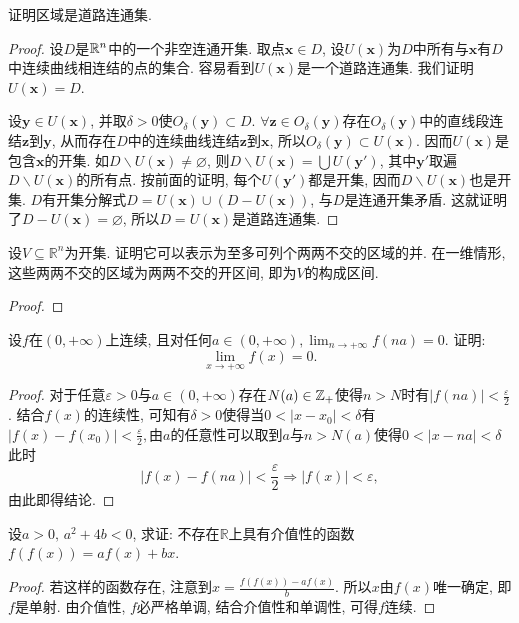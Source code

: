 \begin{quizb}
\woe 证明区域是道路连通集.
\begin{proof}
	设\(D\)是\(\mathbb{R}^n\)中的一个非空连通开集. 取点\(\boldsymbol{x}\in D\), 设\(U\left(\boldsymbol{x}\right)\)为\(D\)中所有与\(\boldsymbol{x}\)有\(D\)中连续曲线相连结的点的集合. 容易看到\(U\left(\boldsymbol{x}\right)\)是一个道路连通集. 我们证明\(U\left(\boldsymbol{x}\right)=D\).
	
	设\(\boldsymbol{y}\in U\left(\boldsymbol{x}\right)\), 并取\(\delta>0\)使\(O_{\delta}(\boldsymbol{y})\subset D\). \(\forall\boldsymbol{z}\in O_{\delta}(\boldsymbol{y})\)存在\(O_{\delta}(\boldsymbol{y})\)中的直线段连结\(\boldsymbol{z}\)到\(\boldsymbol{y}\), 从而存在\(D\)中的连续曲线连结\(\boldsymbol{z}\)到\(\boldsymbol{x}\), 所以\(O_{\delta}(\boldsymbol{y})\subset U\left(\boldsymbol{x}\right)\). 因而\(U\left(\boldsymbol{x}\right)\)是包含\(\boldsymbol{x}\)的开集. 如\(D\backslash U\left(\boldsymbol{x}\right)\ne\varnothing\), 则\(D\backslash U\left(\boldsymbol{x}\right)=\bigcup U\left(\boldsymbol{y}'\right)\), 其中\(\boldsymbol{y}'\)取遍\(D\backslash U\left(\boldsymbol{x}\right)\)的所有点. 按前面的证明, 每个\(U\left(\boldsymbol{y}'\right)\)都是开集, 因而\(D\backslash U\left(\boldsymbol{x}\right)\)也是开集. \(D\)有开集分解式\(D=U\left(\boldsymbol{x}\right)\cup \left(D-U\left(\boldsymbol{x}\right)\right)\), 与\(D\)是连通开集矛盾. 这就证明了\(D-U\left(\boldsymbol{x}\right)=\varnothing\), 所以\(D=U\left(\boldsymbol{x}\right)\)是道路连通集.
\end{proof}
\woe 设\(V\subseteq\mathbb{R}^n\)为开集. 证明它可以表示为至多可列个两两不交的区域的并. 在一维情形, 这些两两不交的区域为两两不交的开区间, 即为\(V\)的构成区间.
\begin{proof}
	
\end{proof}
\woe 设\(f\)在\((0,+\infty)\)上连续, 且对任何\(a\in (0,+\infty),\lim_{n\rightarrow+\infty}f(na)=0.\) 证明:\[\lim_{x\rightarrow+\infty}f(x)=0.\]
\begin{proof}
对于任意\(\varepsilon>0\)与\(a\in(0,+\infty)\)存在\(N(a)\in\mathbb{Z}_+\)使得\(n>N\)时有\(|f(na)|<\frac{\varepsilon}{2}\). 结合\(f(x)\)的连续性, 可知有\(\delta>0\)使得当\(0<|x-x_0|<\delta\)有\(\left|f(x)-f(x_0)\right|<\frac{\varepsilon}{2},\)由\(a\)的任意性可以取到\(a\)与\(n>N(a)\)使得\(0<|x-na|<\delta\)此时\[\left|f(x)-f(na)\right|<\frac{\varepsilon}{2}\Rightarrow |f(x)|<\varepsilon,\]由此即得结论.
\end{proof}
\woe 设\(a>0,\,a^2+4b<0\), 求证: 不存在\(\mathbb{R}\)上具有介值性的函数\(f\left(f(x)\right)=af(x)+bx\).
\begin{proof}
若这样的函数存在, 注意到\(x=\frac{f\left(f(x)\right)-af(x)}{b}\). 所以\(x\)由\(f(x)\)唯一确定, 即\(f\)是单射. 由介值性, \(f\)必严格单调, 结合介值性和单调性, 可得\(f\)连续.


\end{proof}
\end{quizb}
